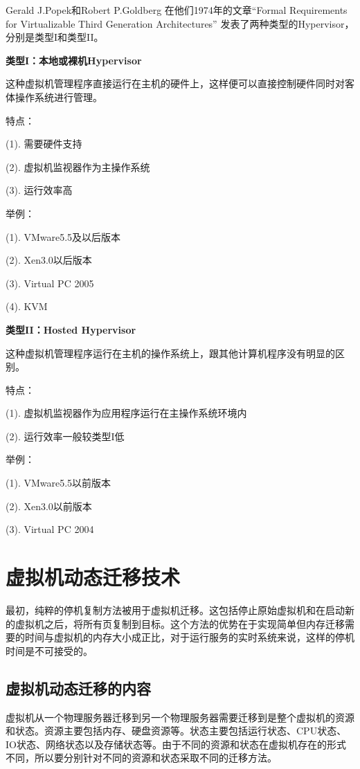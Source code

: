 Gerald J.Popek和Robert P.Goldberg 在他们1974年的文章“Formal Requirements for Virtualizable Third Generation Architectures” 发表了两种类型的Hypervisor，分别是类型I和类型II\cite{Kudinskas}。

\textbf{类型I：本地或裸机Hypervisor}

这种虚拟机管理程序直接运行在主机的硬件上，这样便可以直接控制硬件同时对客体操作系统进行管理。

特点：

    (1). 需要硬件支持

    (2). 虚拟机监视器作为主操作系统

    (3). 运行效率高

举例：

    (1). VMware5.5及以后版本

    (2). Xen3.0以后版本

    (3). Virtual PC 2005

    (4). KVM

\textbf{类型II：Hosted Hypervisor}

这种虚拟机管理程序运行在主机的操作系统上，跟其他计算机程序没有明显的区别。

特点：

    (1). 虚拟机监视器作为应用程序运行在主操作系统环境内

    (2). 运行效率一般较类型I低

举例：

    (1). VMware5.5以前版本

    (2). Xen3.0以前版本
    
    (3). Virtual PC 2004

\section{虚拟机动态迁移技术}
最初，纯粹的停机复制方法被用于虚拟机迁移。这包括停止原始虚拟机和在启动新的虚拟机之后，将所有页复制到目标。这个方法的优势在于实现简单但内存迁移需要的时间与虚拟机的内存大小成正比，对于运行服务的实时系统来说，这样的停机时间是不可接受的。

\subsection{虚拟机动态迁移的内容}
虚拟机从一个物理服务器迁移到另一个物理服务器需要迁移到是整个虚拟机的资源和状态。资源主要包括内存、硬盘资源等。状态主要包括运行状态、CPU状态、IO状态、网络状态以及存储状态等。由于不同的资源和状态在虚拟机存在的形式不同，所以要分别针对不同的资源和状态采取不同的迁移方法。

